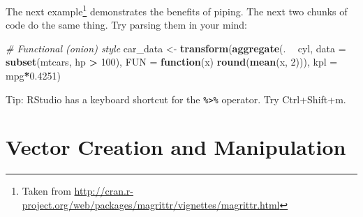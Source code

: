 \documentclass[]{book}
\newenvironment{Shaded}{\begin{snugshade}}{\end{snugshade}}
\newcommand{\KeywordTok}[1]{\textcolor[rgb]{0.13,0.29,0.53}{\textbf{#1}}}
\newcommand{\DataTypeTok}[1]{\textcolor[rgb]{0.13,0.29,0.53}{#1}}
\newcommand{\DecValTok}[1]{\textcolor[rgb]{0.00,0.00,0.81}{#1}}
\newcommand{\FloatTok}[1]{\textcolor[rgb]{0.00,0.00,0.81}{#1}}
\newcommand{\StringTok}[1]{\textcolor[rgb]{0.31,0.60,0.02}{#1}}
\newcommand{\CommentTok}[1]{\textcolor[rgb]{0.56,0.35,0.01}{\textit{#1}}}
\newcommand{\ControlFlowTok}[1]{\textcolor[rgb]{0.13,0.29,0.53}{\textbf{#1}}}
\newcommand{\OperatorTok}[1]{\textcolor[rgb]{0.81,0.36,0.00}{\textbf{#1}}}
\newcommand{\NormalTok}[1]{#1}
\theoremstyle{definition}
\theoremstyle{definition}
\theoremstyle{definition}
\theoremstyle{remark}
\begin{document}
The next example\footnote{Taken from
  \url{http://cran.r-project.org/web/packages/magrittr/vignettes/magrittr.html}}
demonstrates the benefits of piping. The next two chunks of code do the
same thing. Try parsing them in your mind:

\begin{Shaded}
\begin{Highlighting}[]
\CommentTok{# Functional (onion) style}
\NormalTok{car_data <-}\StringTok{ }
\StringTok{  }\KeywordTok{transform}\NormalTok{(}\KeywordTok{aggregate}\NormalTok{(. }\OperatorTok{~}\StringTok{ }\NormalTok{cyl, }
                      \DataTypeTok{data =} \KeywordTok{subset}\NormalTok{(mtcars, hp }\OperatorTok{>}\StringTok{ }\DecValTok{100}\NormalTok{), }
                      \DataTypeTok{FUN =} \ControlFlowTok{function}\NormalTok{(x) }\KeywordTok{round}\NormalTok{(}\KeywordTok{mean}\NormalTok{(x, }\DecValTok{2}\NormalTok{))), }
            \DataTypeTok{kpl =}\NormalTok{ mpg}\OperatorTok{*}\FloatTok{0.4251}\NormalTok{)}
\end{Highlighting}
\end{Shaded}

\begin{Shaded}
\end{Shaded}

Tip: RStudio has a keyboard shortcut for the \texttt{\%\textgreater{}\%}
operator. Try Ctrl+Shift+m.

\section{Vector Creation and
Manipulation}\label{vector-creation-and-manipulation}
\end{document}
